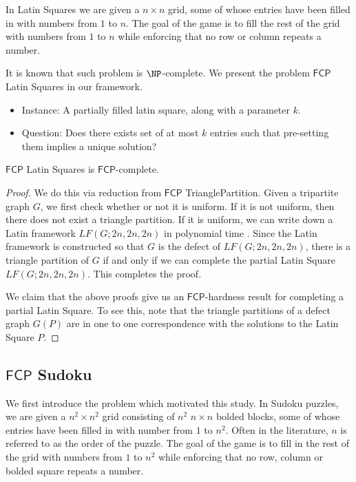 \documentclass[runningheads,a4paper]{llncs}
\begin{document}
In Latin Squares we are given a $n \times n$ grid, some of whose entries have been filled in with numbers from $1$ to $n$. The goal of the game is to fill the rest of the grid with numbers from $1$ to $n$ while enforcing that no row or column repeats a number. 

It is known that such problem is $\NP$-complete. We present the problem $\mathsf{FCP}$ Latin Squares in our framework.

\begin{itemize}
\item Instance: A partially filled latin square, along with a parameter $k$. 
\item Question: Does there exists set of at most $k$ entries such that pre-setting them implies a unique solution?
\end{itemize}


\begin{theorem}
$\mathsf{FCP}$ Latin Squares is $\mathsf{FCP}$-complete.
\end{theorem}

\begin{proof}
We do this via reduction from $\mathsf{FCP}$ TrianglePartition. Given a tripartite graph $G$, we first check whether or not it is uniform. If it is not uniform, then there does not exist a triangle partition. If it is uniform, we can write down a Latin framework $LF(G;2n,2n,2n)$ in polynomial time \cite{colbourn1984complexity}. Since the Latin framework is constructed so that $G$ is the defect of $LF(G;2n,2n,2n)$, there is a triangle partition of $G$ if and only if we can complete the partial Latin Square $LF(G;2n,2n,2n)$. This completes the proof.

We claim that the above proofs give us an $\mathsf{FCP}$-hardness result for completing a partial Latin Square. To see this, note that the triangle partitions of a defect graph $G(P)$ are in one to one correspondence with the solutions to the Latin Square $P$.
\end{proof}

\subsection{$\mathsf{FCP}$ Sudoku}

We first introduce the problem which motivated this study. In Sudoku puzzles, we are given a $n^2 \times n^2$ grid consisting of $n^2$ $n \times n$ bolded blocks, some of whose entries have been filled in with number from $1$ to $n^2$. Often in the literature, $n$ is referred to as the order of the puzzle. The goal of the game is to fill in the rest of the grid with numbers from $1$ to $n^2$ while enforcing that no row, column or bolded square repeats a number. 
\end{document}
